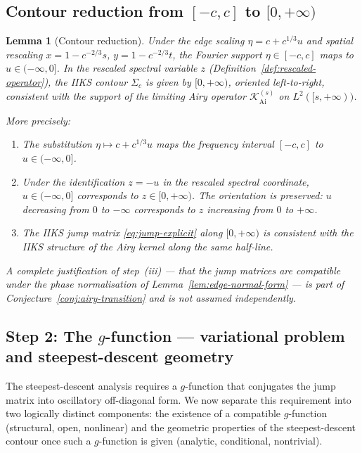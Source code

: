 \documentclass[12pt,a4paper]{amsart}
\newtheorem{lemma}[theorem]{Lemma}
\theoremstyle{definition}
\theoremstyle{remark}
\newcommand{\Kairy}{\mathcal{K}_{\mathrm{Ai}}}
\begin{document}
\subsection{Contour reduction from $[-c,c]$ to $[0,+\infty)$}
\label{sec:contour-reduction}

\begin{lemma}[Contour reduction]
\label{lem:contour-reduction}
Under the edge scaling $\eta = c + c^{1/3}u$ and spatial rescaling
$x = 1 - c^{-2/3}s$, $y = 1 - c^{-2/3}t$, the Fourier support
$\eta \in [-c, c]$ maps to $u \in (-\infty, 0]$.
In the rescaled spectral variable $z$
(Definition~\ref{def:rescaled-operator}),
the IIKS contour $\Sigma_c$ is given by $[0,+\infty)$, oriented
left-to-right, consistent with the support of the limiting Airy
operator $\Kairy^{(s)}$ on $L^2([s,+\infty))$.

More precisely:
\begin{enumerate}[label=(\roman*)]
\item The substitution $\eta \mapsto c + c^{1/3}u$ maps the
  frequency interval $[-c,c]$ to $u \in (-\infty, 0]$.
\item Under the identification $z = -u$ in the rescaled spectral
  coordinate, $u \in (-\infty, 0]$ corresponds to $z \in [0,+\infty)$.
  The orientation is preserved: $u$ decreasing from $0$ to $-\infty$
  corresponds to $z$ increasing from $0$ to $+\infty$.
\item The IIKS jump matrix \eqref{eq:jump-explicit} along $[0,+\infty)$
  is consistent with the IIKS structure of the Airy kernel
  along the same half-line.
\end{enumerate}
A complete justification of step~(iii) --- that the jump matrices
are compatible under the phase normalisation of
Lemma~\ref{lem:edge-normal-form} --- is part of
Conjecture~\ref{conj:airy-transition} and is not assumed independently.
\end{lemma}

\subsection{Step 2: The $g$-function --- variational problem and
steepest-descent geometry}
\label{sec:g-function}

The steepest-descent analysis requires a $g$-function that conjugates
the jump matrix into oscillatory off-diagonal form.
We now separate this requirement into two logically distinct components:
the existence of a compatible $g$-function (structural, open, nonlinear)
and the geometric properties of the steepest-descent contour once such
a $g$-function is given (analytic, conditional, nontrivial).
\end{document}
